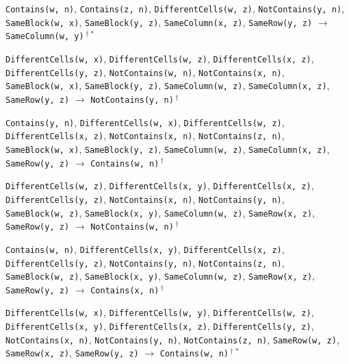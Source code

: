 \documentclass[11pt,a4paper]{article}
\theoremstyle{definition}
\theoremstyle{remark}
\begin{document}
{\begin{enumerate}[label={[\arabic*]},leftmargin=2.6em,itemsep=1pt]
  \item \texttt{Contains(w,~n)}, \allowbreak \texttt{Contains(z,~n)}, \allowbreak \texttt{DifferentCells(w,~z)}, \allowbreak \texttt{NotContains(y,~n)}, \allowbreak \texttt{SameBlock(w,~x)}, \allowbreak \texttt{SameBlock(y,~z)}, \allowbreak \texttt{SameColumn(x,~z)}, \allowbreak \texttt{SameRow(y,~z)} \;$\to$\; \texttt{SameColumn(w,~y)}\,$^{\dagger}$\,$^{\ast}$
  \item \texttt{DifferentCells(w,~x)}, \allowbreak \texttt{DifferentCells(w,~z)}, \allowbreak \texttt{DifferentCells(x,~z)}, \allowbreak \texttt{DifferentCells(y,~z)}, \allowbreak \texttt{NotContains(w,~n)}, \allowbreak \texttt{NotContains(x,~n)}, \allowbreak \texttt{SameBlock(w,~x)}, \allowbreak \texttt{SameBlock(y,~z)}, \allowbreak \texttt{SameColumn(w,~z)}, \allowbreak \texttt{SameColumn(x,~z)}, \allowbreak \texttt{SameRow(y,~z)} \;$\to$\; \texttt{NotContains(y,~n)}\,$^{\dagger}$
  \item \texttt{Contains(y,~n)}, \allowbreak \texttt{DifferentCells(w,~x)}, \allowbreak \texttt{DifferentCells(w,~z)}, \allowbreak \texttt{DifferentCells(x,~z)}, \allowbreak \texttt{NotContains(x,~n)}, \allowbreak \texttt{NotContains(z,~n)}, \allowbreak \texttt{SameBlock(w,~x)}, \allowbreak \texttt{SameBlock(y,~z)}, \allowbreak \texttt{SameColumn(w,~z)}, \allowbreak \texttt{SameColumn(x,~z)}, \allowbreak \texttt{SameRow(y,~z)} \;$\to$\; \texttt{Contains(w,~n)}\,$^{\dagger}$
  \item \texttt{DifferentCells(w,~z)}, \allowbreak \texttt{DifferentCells(x,~y)}, \allowbreak \texttt{DifferentCells(x,~z)}, \allowbreak \texttt{DifferentCells(y,~z)}, \allowbreak \texttt{NotContains(x,~n)}, \allowbreak \texttt{NotContains(y,~n)}, \allowbreak \texttt{SameBlock(w,~z)}, \allowbreak \texttt{SameBlock(x,~y)}, \allowbreak \texttt{SameColumn(w,~z)}, \allowbreak \texttt{SameRow(x,~z)}, \allowbreak \texttt{SameRow(y,~z)} \;$\to$\; \texttt{NotContains(w,~n)}\,$^{\dagger}$
  \item \texttt{Contains(w,~n)}, \allowbreak \texttt{DifferentCells(x,~y)}, \allowbreak \texttt{DifferentCells(x,~z)}, \allowbreak \texttt{DifferentCells(y,~z)}, \allowbreak \texttt{NotContains(y,~n)}, \allowbreak \texttt{NotContains(z,~n)}, \allowbreak \texttt{SameBlock(w,~z)}, \allowbreak \texttt{SameBlock(x,~y)}, \allowbreak \texttt{SameColumn(w,~z)}, \allowbreak \texttt{SameRow(x,~z)}, \allowbreak \texttt{SameRow(y,~z)} \;$\to$\; \texttt{Contains(x,~n)}\,$^{\dagger}$
  \item \texttt{DifferentCells(w,~x)}, \allowbreak \texttt{DifferentCells(w,~y)}, \allowbreak \texttt{DifferentCells(w,~z)}, \allowbreak \texttt{DifferentCells(x,~y)}, \allowbreak \texttt{DifferentCells(x,~z)}, \allowbreak \texttt{DifferentCells(y,~z)}, \allowbreak \texttt{NotContains(x,~n)}, \allowbreak \texttt{NotContains(y,~n)}, \allowbreak \texttt{NotContains(z,~n)}, \allowbreak \texttt{SameRow(w,~z)}, \allowbreak \texttt{SameRow(x,~z)}, \allowbreak \texttt{SameRow(y,~z)} \;$\to$\; \texttt{Contains(w,~n)}\,$^{\dagger}$\,$^{\ast}$
\end{enumerate}}
\end{document}
